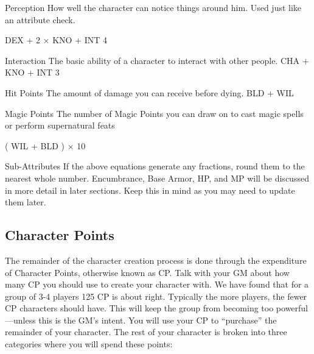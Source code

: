 \documentclass[twoside]{book}
\begin{document}
                  
                  
                   Perception   
                     How well the character can notice things
                     around him. Used just like an attribute check.
                     
                             DEX  +
                        2  ×    KNO
                      +    INT      4
                         
                    
                  
                  
                   Interaction   
                     The basic ability of a character to interact
                     with other people. 
                           CHA  +
                      KNO  +  INT 
                       3     
                    
                  
                  
                   Hit Points   
                     The amount of damage you can receive before
                     dying. 
                       BLD  +  WIL
                     
                    
                  
                  
                   Magic Points   
                     The number of Magic Points you can draw on to
                     cast magic spells or perform supernatural feats
                     
                           (    WIL  
                      +    BLD    )   
                     ×    10     
                    
                  
                
              Sub-Attributes  
             If the above equations generate any fractions, round
               them to the nearest whole number.  Encumbrance, Base Armor, HP, and MP will be
               discussed in more detail in later sections. Keep this in
               mind as you may need to update them later. 
\subsection{Character Points}
     The remainder of the character creation process is
               done through the expenditure of Character Points,
               otherwise known as CP. Talk with your GM about how many CP
               you should use to create your character with. We have
               found that for a group of 3-4 players 125 CP is about
               right. Typically the more players, the fewer CP characters
               should have. This will keep the group from becoming too
               powerful—unless this is the GM’s intent.
                You will use your CP to “purchase” the
               remainder of your character. The rest of your character is
               broken into three categories where you will spend these
               points:   
                
\end{document}
